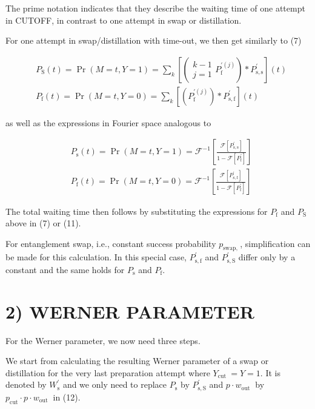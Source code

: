 \documentclass[10pt]{article}
\begin{document}
The prime notation indicates that they describe the waiting time of one attempt in CUTOFF, in contrast to one attempt in swap or distillation.

For one attempt in swap/distillation with time-out, we then get similarly to (7)

$$
\begin{aligned}
& P_{\mathrm{S}}(t)=\operatorname{Pr}(M=t, Y=1)=\sum_{k}\left[\left(\begin{array}{c}
k-1 \\
j=1
\end{array} P_{\mathrm{f}}^{\prime(j)}\right) * P_{\mathrm{s}, \mathrm{s}}^{\prime}\right](t) \\
& P_{\mathrm{f}}(t)=\operatorname{Pr}(M=t, Y=0)=\sum_{k}\left[\left( P_{\mathrm{f}}^{\prime(j)}\right) * P_{\mathrm{s}, \mathrm{f}}^{\prime}\right](t)
\end{aligned}
$$

as well as the expressions in Fourier space analogous to

$$
\begin{aligned}
& P_{\mathrm{s}}(t)=\operatorname{Pr}(M=t, Y=1)=\mathcal{F}^{-1}\left[\frac{\mathcal{F}\left[P_{\mathrm{s}, \mathrm{s}}^{\prime}\right]}{1-\mathcal{F}\left[P_{\mathrm{f}}^{\prime}\right]}\right] \\
& P_{\mathrm{f}}(t)=\operatorname{Pr}(M=t, Y=0)=\mathcal{F}^{-1}\left[\frac{\mathcal{F}\left[P_{\mathrm{s}, \mathrm{f}}^{\prime}\right]}{1-\mathcal{F}\left[P_{\mathrm{f}}^{\prime}\right]}\right]
\end{aligned}
$$

The total waiting time then follows by substituting the expressions for $P_{\mathrm{f}}$ and $P_{\mathrm{S}}$ above in (7) or (11).

For entanglement swap, i.e., constant success probability $p_{\text {swap, }}$, simplification can be made for this calculation. In this special case, $P_{\mathrm{s}, \mathrm{f}}^{\prime}$ and $P_{\mathrm{s}, \mathrm{S}}^{\prime}$ differ only by a constant and the same holds for $P_{\mathrm{s}}$ and $P_{\mathrm{f}}$.

\section*{2) WERNER PARAMETER}
For the Werner parameter, we now need three steps.

We start from calculating the resulting Werner parameter of a swap or distillation for the very last preparation attempt where $Y_{\text {cut }}=Y=1$. It is denoted by $W_{\mathrm{s}}^{\prime}$ and we only need to replace $P_{\mathrm{s}}$ by $P_{\mathrm{s}, \mathrm{S}}^{\prime}$ and $p \cdot w_{\text {out }}$ by $p_{\mathrm{cut}} \cdot p \cdot w_{\text {out }}$ in (12).
\end{document}
